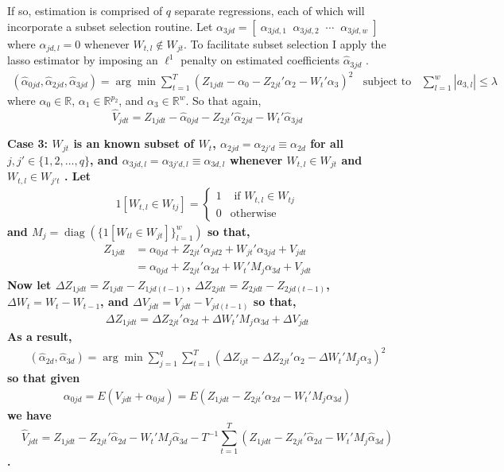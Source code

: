 \documentclass[10pt]{article}
\DeclareMathOperator{\diag}{diag}
\begin{document}
\noindent If so, estimation is comprised of $q$ separate regressions, each of which will incorporate a subset selection routine. Let $\alpha_{3jd} =  [\;\alpha_{3jd,1} \;\; \alpha_{3jd,2} \;\; \cdots \;\; \alpha_{3jd,w} \; ]$ where $\alpha_{jd,l} = 0$ whenever $W_{t,l} \notin W_{jt}$. To facilitate subset selection I apply the lasso estimator by imposing an $\ell^1$ penalty on estimated coefficients $\hat{\alpha}_{3jd}$ .
%
\begin{align*} 
(\hat{\alpha}_{0jd}, \hat{\alpha}_{2jd},\hat{\alpha}_{3jd})  = \arg \min \sum_{t=1}^T\left(Z_{1jdt} - \alpha_{0} -  Z_{2jt}'\alpha_{2} - W_{t}'\alpha_{3} \right)^2 \;\; \text{ subject to } \;\; \sum_{l = 1}^w |a_{3,l}| \leq \lambda
\end{align*}
where $\alpha_0 \in \mathbb{R}$, $\alpha_{1} \in \mathbb{R}^{p_2}$, and $\alpha_{3} \in \mathbb{R}^{w}$. So that again,
 $$\hat{V}_{jdt} = Z_{1jdt} -\hat{\alpha}_{0jd} - Z_{2jt}'\hat{\alpha}_{2jd} - W_{t}'\hat{\alpha}_{3jd}$$ 

\noindent \bf Case 3: \rm $W_{jt}$ is an known subset of $W_{t}$, $\alpha_{2jd} =\alpha_{2j'd} \equiv \alpha_{2d}$ for all $j,j' \in \{1,2, \ldots,q\}$, and $\alpha_{3jd,l} = \alpha_{3j'd,l} \equiv \alpha_{3d,l}$ whenever $W_{t,l} \in W_{jt}$ and $W_{t,l} \in W_{j't}$ . Let
\begin{align*}
1[W_{t,l} \in W_{tj}] = 
\begin{cases} 
1 & \text{ if } W_{t,l} \in W_{tj} \\ 
0 & \text{otherwise}
\end{cases}
%
\end{align*}
%
and $M_j = \diag(\{1[ W_{tl} \in W_{jt}] \}_{l=1}^w)$ so that,
%
\begin{align*}
Z_{1jdt} &= \alpha_{0jd} + Z_{2jt}' \alpha_{jd2} + W_{jt}' \alpha_{3jd} + V_{jdt} \\
& =\alpha_{0jd} + Z_{2jt}' \alpha_{2d} + W_{t}'M_j \alpha_{3d} + V_{jdt}
\end{align*}
Now let $\Delta Z_{1jdt} = Z_{1jdt} - Z_{1jd(t-1)}$, $\Delta Z_{2jdt} = Z_{2jdt} - Z_{2jd(t-1)}$, $\Delta W_{t} = W_{t} - W_{t-1}$, and $\Delta V_{jdt} = V_{jdt} - V_{jd(t-1)}$ so that, 
\begin{align*} 
\Delta Z_{1jdt} =\Delta Z_{2jt}' \alpha_{2d} + \Delta W_{t}'M_j \alpha_{3d} + \Delta V_{jdt}
\end{align*}
As a result,
%
\begin{align*} 
(\hat{\alpha}_{2d},\hat{\alpha}_{3d})  = \arg \min \sum_{j=1}^q\sum_{t=1}^T\left( \Delta Z_{ijt} -  \Delta Z_{2jt}'\alpha_{2} - \Delta W_{t}'M_j\alpha_{3} \right)^2 
\end{align*}
%
\noindent so that given
\begin{align*} 
\alpha_{0jd} =  E(V_{jdt} + \alpha_{0jd}) =
E( Z_{1jdt} - Z_{2jt}'\alpha_{2d} - W_{t}'M_j\alpha_{3d}) 
\end{align*}
we have
 $$\hat{V}_{jdt} = Z_{1jdt} - Z_{2jt}'\hat{\alpha}_{2d} - W_{t}'M_j\hat{\alpha}_{3d} - T^{-1}\sum_{t=1}^T  (Z_{1jdt} - Z_{2jt}'\hat{\alpha}_{2d} - W_{t}'M_j\hat{\alpha}_{3d}) $$. 
\end{document}
